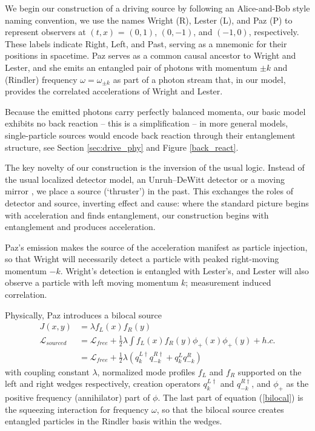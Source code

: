 \documentclass[12pt,a4paper]{article}
\begin{document}
We begin our construction of a driving source by following an Alice-and-Bob style naming convention, we use the names Wright (R), Lester (L), and Paz (P) to represent observers at $(t,x)$ = $(0,1)$, $(0,-1)$, and $(-1,0)$, respectively. These labels indicate Right, Left, and Past, serving as a mnemonic for their positions in spacetime. Paz serves as a common causal ancestor to Wright and Lester, and she emits an entangled pair of photons with momentum $\pm k$ and (Rindler) frequency $\omega = \omega_{\pm k}$ as part of a photon stream that, in our model, provides the correlated accelerations of Wright and Lester.

Because the emitted photons carry perfectly balanced momenta, our basic model exhibits no back reaction -- this is a simplification -- in more general models, single-particle sources would encode back reaction through their entanglement structure, see Section \ref{sec:drive_phy} and Figure \ref{back_react}.

The key novelty of our construction is the inversion of the usual logic. Instead of the usual localized detector model, an Unruh–DeWitt detector \cite{unruh1976notes,einstein1979general} or a moving mirror \cite{fulling1976radiation}, we place a source (‘thruster’) in the past. This exchanges the roles of detector and source, inverting effect and cause: where the standard picture begins with acceleration and finds entanglement, our construction begins with entanglement and produces acceleration.

Paz's emission makes the source of the acceleration manifest as particle injection, so that Wright will necessarily detect a particle with peaked right-moving momentum $-k$. Wright’s detection is entangled with Lester’s, and Lester will also observe a particle with left moving momentum $k$; measurement induced correlation.  

Physically, Paz introduces a bilocal source 
\begin{equation}
  \begin{aligned}
    J(x,y) &= \lambda f_L(x)f_R(y)\\
    \mathscr{L}_{sourced} & = \mathscr{L}_{free} + \frac{1}{2}\lambda \int f_L(x)f_R(y) \phi_+(x) \phi_+(y)  + h.c.\\
                        &= \mathscr{L}_{free} + \frac{1}{2}\lambda \left(q_{k}^{L\dagger} q_{-k}^{R\dagger} + q_{k}^{L} q_{-k}^{R} \right)
 \end{aligned}
 \label{bilocal}
\end{equation}
with coupling constant $\lambda$, normalized mode profiles $f_L$ and $f_R$ supported on the left and right wedges respectively, creation operators $q_{k}^{L\dagger}$ and $q_{-k}^{R\dagger}$, and $\phi_+$ as the positive frequency (annihilator) part of $\phi$. The last part of equation (\ref{bilocal}) is the squeezing interaction for frequency $\omega$, so that the bilocal source creates entangled particles in the Rindler basis within the wedges.
\end{document}
